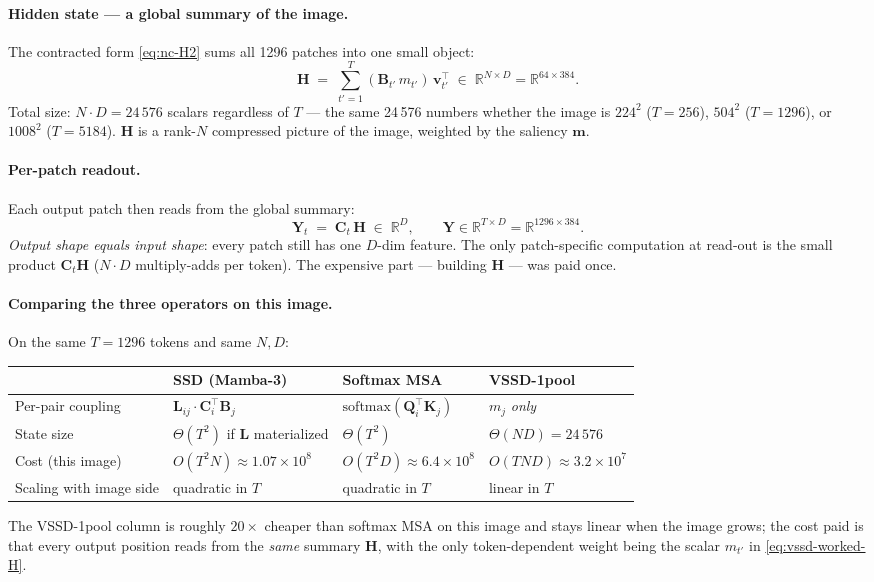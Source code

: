\documentclass[11pt,a4paper]{article}
\begin{document}
\paragraph{Hidden state — a global summary of the image.}
The contracted form \eqref{eq:nc-H2} sums all 1296 patches into one
small object:
\begin{equation}\label{eq:vssd-worked-H}
  \bm{H}
   \;=\; \sum_{t'=1}^{T} (\bm{B}_{t'}\,m_{t'})\,\bm{v}_{t'}^\top
   \;\in\;\mathbb{R}^{N\times D} = \mathbb{R}^{64\times 384}.
\end{equation}
Total size: $N\!\cdot\!D = 24\,576$ scalars regardless of $T$ — the
same 24\,576 numbers whether the image is $224^{2}$ ($T\!=\!256$),
$504^{2}$ ($T\!=\!1296$), or $1008^{2}$ ($T\!=\!5184$). $\bm{H}$ is a
rank-$N$ compressed picture of the image, weighted by the saliency
$\bm{m}$.

\paragraph{Per-patch readout.}
Each output patch then reads from the global summary:
\begin{equation}\label{eq:vssd-worked-Y}
  \bm{Y}_t \;=\; \bm{C}_t\,\bm{H}
  \;\in\;\mathbb{R}^{D},
  \qquad
  \bm{Y}\in\mathbb{R}^{T\times D} = \mathbb{R}^{1296\times 384}.
\end{equation}
\emph{Output shape equals input shape}: every patch still has one
$D$-dim feature. The only patch-specific computation at read-out is
the small product $\bm{C}_t\bm{H}$ ($N\!\cdot\!D$ multiply-adds per
token). The expensive part — building $\bm{H}$ — was paid once.

\paragraph{Comparing the three operators on this image.}
On the same $T\!=\!1296$ tokens and same $N, D$:
\begin{center}
\begin{tabular}{|l|l|l|l|}
\hline
 & \textbf{SSD (Mamba-3)} & \textbf{Softmax MSA} & \textbf{VSSD-1pool} \\ \hline
Per-pair coupling      & $\bm{L}_{ij}\!\cdot\!\bm{C}_i^\top\bm{B}_j$ & $\mathrm{softmax}(\bm{Q}_i^\top\bm{K}_j)$ & $m_j$ \emph{only} \\ \hline
State size             & $\Theta(T^2)$ if $\bm{L}$ materialized & $\Theta(T^2)$ & $\Theta(ND) = 24\,576$ \\ \hline
Cost (this image)      & $O(T^2 N) \approx 1.07\!\times\!10^{8}$ & $O(T^2 D) \approx 6.4\!\times\!10^{8}$ & $O(TND) \approx 3.2\!\times\!10^{7}$ \\ \hline
Scaling with image side & quadratic in $T$ & quadratic in $T$ & linear in $T$ \\ \hline
\end{tabular}
\end{center}
The VSSD-1pool column is roughly $20\times$ cheaper than softmax MSA on
this image and stays linear when the image grows; the cost paid is
that every output position reads from the \emph{same} summary
$\bm{H}$, with the only token-dependent weight being the scalar
$m_{t'}$ in \eqref{eq:vssd-worked-H}.
\end{document}
